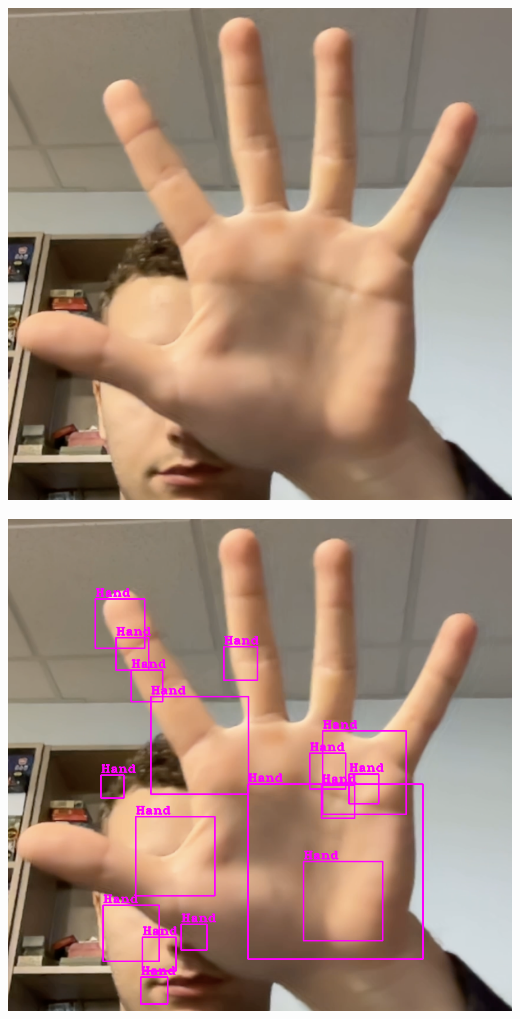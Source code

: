 \documentclass[11pt]{article}
\begin{document}
\begin{minipage}{0.45\textwidth}
    \centering
    \includegraphics[width=\textwidth]{images/cascade4.png}
    \label{fig:res_cascade4}
\end{minipage}
\begin{minipage}{0.45\textwidth}
    \centering
    \includegraphics[width=\textwidth]{images/cascade5.png}
    \label{fig:res_cascade5}
\end{minipage}
\end{document}
